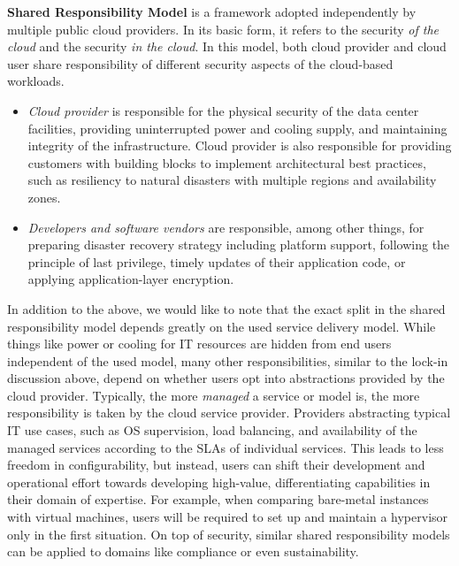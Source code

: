 
\textbf{Shared Responsibility Model} is a framework adopted independently by multiple public cloud providers. In its basic form, it refers to the security \emph{of the cloud} and the security \emph{in the cloud}. In this model, both cloud provider and cloud user share responsibility of different security aspects of the cloud-based workloads.
\begin{itemize}
  \item \emph{Cloud provider} is responsible for the physical security of the data center facilities, providing uninterrupted power and cooling supply, and maintaining integrity of the infrastructure. Cloud provider is also responsible for providing customers with building blocks to implement architectural best practices, such as resiliency to natural disasters with multiple regions and availability zones.
  
  \item \emph{Developers and software vendors} are responsible, among other things, for preparing disaster recovery strategy including platform support, following the principle of last privilege, timely updates of their application code, or applying application-layer encryption.
\end{itemize}

In addition to the above, we would like to note that the exact split in the shared responsibility model depends greatly on the used service delivery model. While things like power or cooling for IT resources are hidden from end users independent of the used model, many other responsibilities, similar to the lock-in discussion above, depend on whether users opt into abstractions provided by the cloud provider. Typically, the more \emph{managed} a service or model is, the more responsibility is taken by the cloud service provider. Providers abstracting typical IT use cases, such as OS supervision, load balancing, and availability of the managed services according to the SLAs of individual services. This leads to less freedom in configurability, but instead, users can shift their development and operational effort towards developing high-value, differentiating capabilities in their domain of expertise. For example, when comparing bare-metal instances with virtual machines, users will be required to set up and maintain a hypervisor only in the first situation. On top of security, similar shared responsibility models can be applied to domains like compliance or even sustainability.

